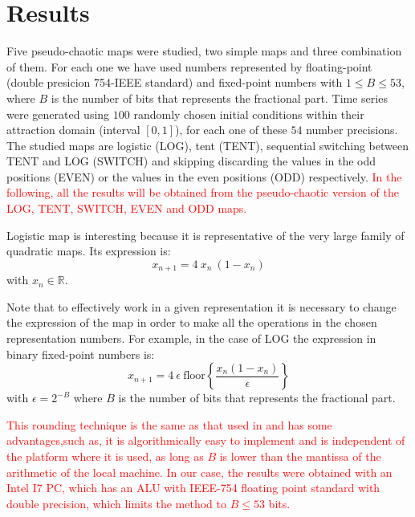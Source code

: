 \section{Results}\label{sec:resultados}

Five pseudo-chaotic maps were studied, two simple maps and three combination of them.
For each one we have used numbers represented by floating-point (double presicion 754-IEEE standard) and  fixed-point numbers with $1\leq B \leq 53$, where $B$ is the number of bits that represents the fractional part.
Time series were generated using $100$ randomly chosen initial conditions within their attraction domain (interval $[0,1]$), for each one of these $54$ number precisions.
The studied maps are logistic (LOG), tent (TENT), sequential switching between TENT and LOG (SWITCH) and skipping discarding the values in the odd positions (EVEN) or the values in the even positions (ODD) respectively.
\textcolor{red}{In the following, all the results will be obtained from the pseudo-chaotic version of the LOG, TENT, SWITCH, EVEN and ODD maps.}

Logistic map is interesting because it is representative of the very large family of quadratic maps.
Its expression is:
%
\begin{equation}\label{eq:LOG}
x_{n+1}=4~x_{n}~(1-x_{n}) 
\end{equation}
%
with $x_n \in \mathbb{R}$.

Note that to effectively work in a given representation it is necessary to change the expression of the map in order to make all the operations in the chosen representation numbers. For example, in the case of LOG the expression in binary fixed-point numbers is:
%
\begin{equation}\label{eq:LOGB2}
x_{n+1}=4 ~\epsilon ~\text{floor}\left\{\frac{x_n(1-x_n)}{\epsilon}\right\}
\end{equation}
%
with $\epsilon = 2^{-B}$ where $B$ is the number of bits that represents the fractional part.

\textcolor{red}{This rounding technique is the same as that used in \cite{Antonelli2012, Grebogi1988, Nagaraj2008} and has some advantages,such as, it is algorithmically easy to implement and is independent of the platform where it is used, as long as $B$ is lower than the mantissa of the arithmetic of the local machine.
In our case, the results were obtained with an Intel I7 PC, which has an ALU with IEEE-754 floating point standard with double precision, which limits the method to $B \leq 53$ bits.}

